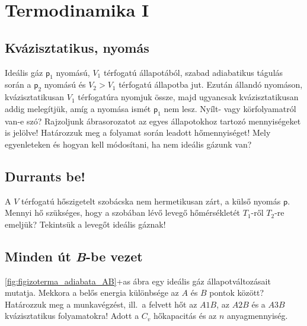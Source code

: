 \documentclass[12pt,a4paper]{scrartcl}
\newcommand{\pres}{\mathsf p}	%
\begin{document}
\section{Termodinamika I}
\subsection{Kvázisztatikus, nyomás}
Ideális gáz $\pres_1$ nyomású, $V_1$ térfogatú állapotából, szabad adiabatikus tágulás során a $\pres_2$ nyomású és $V_2 > V_1$  térfogatú állapotba jut. Ezután állandó nyomáson, kvázisztatikusan $V_1$  térfogatúra nyomjuk össze, majd ugyancsak kvázisztatikusan addig melegítjük, amíg a nyomása ismét $\pres_1$ nem lesz. Nyílt- vagy körfolyamatról van-e szó? Rajzoljunk ábrasorozatot az egyes állapotokhoz tartozó mennyiségeket is jelölve! Határozzuk meg a folyamat során leadott hőmennyiséget! Mely egyenleteken és hogyan kell módosítani, ha nem ideális gázunk van?
\subsection{Durrants be!}
A $V$ térfogatú hőszigetelt szobácska nem hermetikusan zárt, a külső nyomás $\pres$. Mennyi hő szükséges, hogy a szobában lévő levegő hőmérsékletét $T_1$-ről $T_2$-re emeljük? Tekintsük a levegőt ideális gáznak!
\subsection{Minden út \textit{B}-be vezet} %
\Atold\ref{fig:figizoterma_adiabata_AB}+as{} ábra egy ideális gáz állapotváltozásait mutatja. Mekkora a belős energia különbsége az $A$ és $B$ pontok között? Határozzuk meg a munkavégzést, ill.\ a felvett hőt az $A1B$, az $A2B$ és a $A3B$ kvázisztatikus folyamatokra! Adott a $C_v$ hőkapacitás és az $n$ anyagmennyiség.
\end{document}
